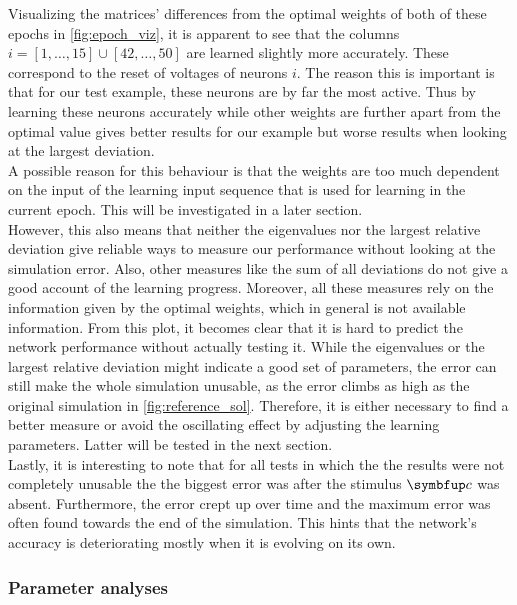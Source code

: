 Visualizing the matrices' differences from the optimal weights  of both of these epochs in \cref{fig:epoch_viz}, it is apparent to see that the columns $i = [1,\dots,15] \cup [42,\dots,50]$ are learned slightly more accurately. These correspond to the reset of voltages of neurons $i$. The reason this is important is that for our test example, these neurons are by far the most active. Thus by learning these neurons accurately while other weights are further apart from the optimal value gives better results for our example but worse results when looking at the largest deviation.\\
A possible reason for this behaviour is that the weights are too much dependent on the input of the learning input sequence that is used for learning in the current epoch. This will be investigated in a later section.\\
However, this also means that neither the eigenvalues nor the largest relative deviation give reliable ways to measure our performance without looking at the simulation error. Also, other measures like the sum of all deviations do not give a good account of the learning progress. Moreover, all these measures rely on the information given by the optimal weights, which in general is not available  information. From this plot, it becomes clear that it is hard to predict the network performance without actually testing it. While the eigenvalues or the largest relative deviation might indicate a good set of parameters, the error can still make the whole simulation unusable, as the error climbs as high as the original simulation in \cref{fig:reference_sol}. Therefore, it is either necessary to find a better measure or avoid the oscillating effect by adjusting the learning parameters. Latter will be tested in the next section.\\
Lastly, it is interesting to note that for all tests in which the the results were not completely unusable the the biggest error was after the stimulus $\bmu{c}$ was absent. Furthermore, the error crept up over time and the maximum error was often found towards the end of the simulation. This hints that the network's accuracy is deteriorating mostly when it is evolving on its own.\\

\subsubsection{Parameter analyses}
